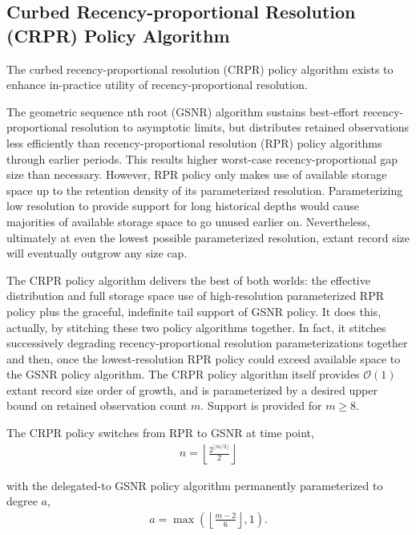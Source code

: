 \subsection{Curbed Recency-proportional Resolution (CRPR) Policy Algorithm}
\label{sec:curbed-recency-proportional-resolution-algo}

The curbed recency-proportional resolution (CRPR) policy algorithm exists to enhance in-practice utility of recency-proportional resolution.

The geometric sequence nth root (GSNR) algorithm sustains best-effort recency-proportional resolution to asymptotic limits, but distributes retained observations less efficiently than recency-proportional resolution (RPR) policy algorithms through earlier periods.
This results higher worst-case recency-proportional gap size than necessary.
However, RPR policy only makes use of available storage space up to the retention density of its parameterized resolution.
Parameterizing low resolution to provide support for long historical depths would cause majorities of available storage space to go unused earlier on.
Nevertheless, ultimately at even the lowest possible parameterized resolution, extant record size will eventually outgrow any size cap.

The CRPR policy algorithm delivers the best of both worlds: the effective distribution and full storage space use of high-resolution parameterized RPR policy plus the graceful, indefinite tail support of GSNR policy.
It does this, actually, by stitching these two policy algorithms together.
In fact, it stitches successively degrading recency-proportional resolution parameterizations together and then, once the lowest-resolution RPR policy could exceed available space to the GSNR policy algorithm.
The CRPR policy algorithm itself provides $\mathcal{O}(1)$ extant record size order of growth, and is parameterized by a desired upper bound on retained observation count $m$.
Support is provided for $m \geq 8$.

The CRPR policy switches from RPR to GSNR at time point,
\begin{align*}
n = \left\lfloor \frac{2^{\lfloor m/3 \rfloor}}{2} \right\rfloor
\end{align*}

with the delegated-to GSNR policy algorithm permanently parameterized to degree $a$,
\begin{align*}
a = \max \left(
  \left\lfloor \frac{m - 2}{6} \right\rfloor,
  1
\right).
\end{align*}

